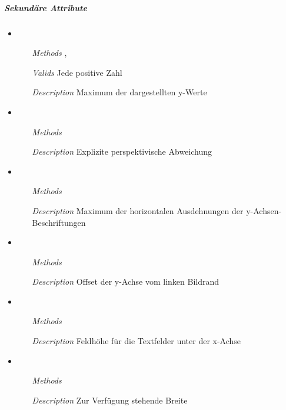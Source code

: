 \subparagraph{Sekund\"are Attribute}
\begin{itemize}
  
\item {}
\begin{enumerate}
\item[\textit{Methods}] , 
\item[\textit{Valids}] Jede positive Zahl
\item[\textit{Description}] Maximum der dargestellten y-Werte
\end{enumerate}

\item {}
\begin{enumerate}
\item[\textit{Methods}] 
\item[\textit{Description}] Explizite perspektivische Abweichung
\end{enumerate}

\item {}
\begin{enumerate}
\item[\textit{Methods}] 
\item[\textit{Description}] Maximum der horizontalen Ausdehnungen der
  y-Achsen-Beschriftungen
\end{enumerate}

\item {}
\begin{enumerate}
\item[\textit{Methods}] 
\item[\textit{Description}] Offset der y-Achse vom linken Bildrand
\end{enumerate}

\item {}
\begin{enumerate}
\item[\textit{Methods}] 
\item[\textit{Description}] Feldh\"ohe f\"ur die Textfelder unter der
  x-Achse
\end{enumerate}

\item {}
\begin{enumerate}
\item[\textit{Methods}] 
\item[\textit{Description}] Zur Verf\"ugung stehende Breite
\end{enumerate}


\end{itemize}
